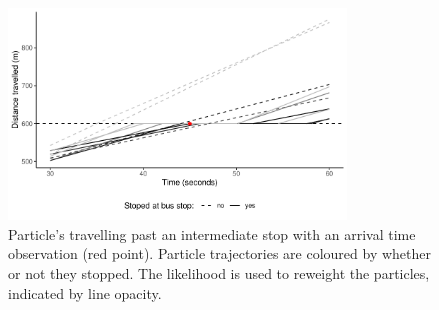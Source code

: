 \begin{knitrout}
\color{fgcolor}\begin{figure}

{\centering \includegraphics[width=0.8\textwidth]{figure/tu_update-1} 

}

\caption[Particle's travelling past an intermediate stop with an arrival time observation (red point)]{Particle's travelling past an intermediate stop with an arrival time observation (red point). Particle trajectories are coloured by whether or not they stopped. The likelihood is used to reweight the particles, indicated by line opacity.}\label{fig:tu_update}
\end{figure}


\end{knitrout}
